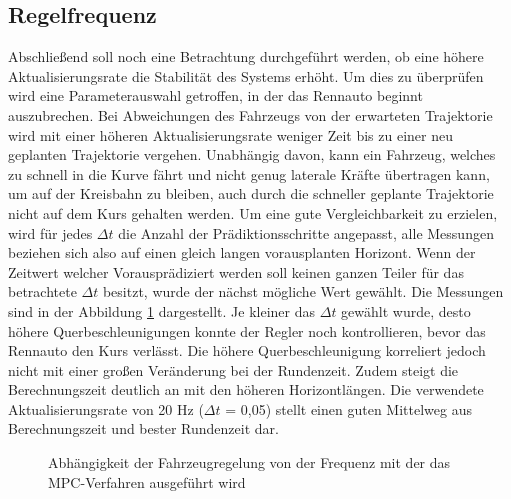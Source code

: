 \documentclass{like}
\begin{document}
\subsection{Regelfrequenz}
Abschließend soll noch eine Betrachtung durchgeführt werden, ob eine höhere Aktualisierungsrate die Stabilität des Systems erhöht. Um dies zu überprüfen wird eine Parameterauswahl getroffen, in der das Rennauto beginnt auszubrechen. Bei Abweichungen des Fahrzeugs von der erwarteten Trajektorie wird mit einer höheren Aktualisierungsrate weniger Zeit bis zu einer neu geplanten Trajektorie vergehen. Unabhängig davon, kann ein Fahrzeug, welches zu schnell in die Kurve fährt und nicht genug laterale Kräfte übertragen kann, um auf der Kreisbahn zu bleiben, auch durch die schneller geplante Trajektorie nicht auf dem Kurs gehalten werden. 
Um eine gute Vergleichbarkeit zu erzielen, wird für jedes $\Delta t$ die Anzahl der Prädiktionsschritte angepasst, alle Messungen beziehen sich also auf einen gleich langen vorausplanten Horizont. Wenn der Zeitwert welcher Vorausprädiziert werden soll keinen ganzen Teiler für das betrachtete $\Delta t$ besitzt, wurde der nächst mögliche Wert gewählt. Die Messungen sind in der Abbildung \ref{fig:measureUpdateRate} dargestellt. Je kleiner das $\Delta t$ gewählt wurde, desto höhere Querbeschleunigungen konnte der Regler noch kontrollieren, bevor das Rennauto den Kurs verlässt. Die höhere Querbeschleunigung korreliert jedoch nicht mit einer großen Veränderung bei der Rundenzeit. Zudem steigt die Berechnungszeit deutlich an mit den höheren Horizontlängen. Die verwendete Aktualisierungsrate von 20 Hz ($\Delta t$ = 0,05) stellt einen guten Mittelweg aus Berechnungszeit und bester Rundenzeit dar.

\begin{figure}
	\centering
	\caption{Abhängigkeit der Fahrzeugregelung von der Frequenz mit der das \ac{MPC}-Verfahren ausgeführt wird }\label{fig:measureUpdateRate}
\end{figure}
\end{document}
